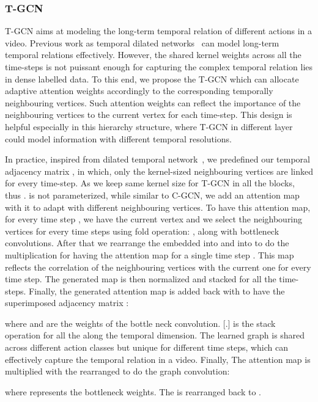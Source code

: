 \documentclass{bmvc2k}
\begin{document}
\subsubsection{T-GCN}
T-GCN aims at modeling the long-term temporal relation of different actions in a video.
Previous work as temporal dilated networks~\cite{lea2017temporal,oord2016wavenet} can model long-term temporal relations effectively. However, the shared kernel weights across all the time-steps is not puissant enough for capturing the complex temporal relation lies in dense labelled data. 
To this end, we propose the T-GCN which can allocate adaptive attention weights accordingly to the corresponding temporally neighbouring vertices. Such attention weights can reflect the importance of the neighbouring vertices to the current vertex for each time-step.
This design is helpful especially in this hierarchy structure, where T-GCN in different layer could model information with different temporal resolutions. 

In practice, inspired from dilated temporal network~\cite{lea2017temporal}, we predefined our temporal adjacency matrix , in which, only the kernel-sized neighbouring vertices are linked for every time-step. 
As we keep same kernel size  for T-GCN in all the blocks, thus .  is not parameterized, while similar to C-GCN, we add an attention map with it to adapt with different neighbouring vertices. 
To have this attention map, for every time step , we have the current vertex  
and we select the  neighbouring vertices for every time steps using fold operation: , along with bottleneck convolutions. 
After that we rearrange the embedded  into  and  into  to do the multiplication for having the attention map for a single time step . 
This map reflects the correlation of the neighbouring vertices with the current one for every time step. The generated map is then normalized and stacked for all the time-steps.
Finally, the generated attention map is added back with  to have the superimposed adjacency matrix : 

where  and  are the weights of the bottle neck convolution. [.] is the stack operation for all the  along the temporal dimension.
The learned graph is shared across different action classes but unique for different time steps, which can effectively capture the temporal relation in a video. 
Finally, The attention map is multiplied with the rearranged  to do the graph convolution:

where  represents the bottleneck weights. The  is rearranged back to . 
\fi
\end{document}
